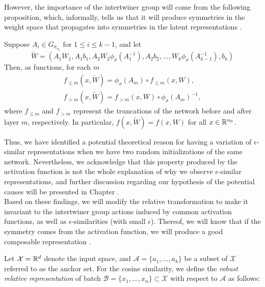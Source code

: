 \documentclass[../main.tex]{subfiles}
\begin{document}
However, the importance of the intertwiner group will come from the following proposition, which, informally, tells us that it will produce symmetries in the weight space that propagates into symmetries in the latent representations \cite{godfrey_symmetries_2023}.

\begin{proposition}
  \label{lem:comm-w-sig}
  Suppose $A_i \in G_{\sigma_{n_i}}$ for $1 \leq i \leq k-1$, and let 
  \begin{equation*}
  \widetilde{W}  = (A_1 W_1, A_1b_1, A_2 W_2 \phi_{\sigma}(A_1^{-1}), A_2 b_2 , \dots,
  W_{k}\phi_{\sigma}(A_{k-1}^{-1}), b_{k})
  \end{equation*}
  Then, as functions, for each $m$
  \begin{gather*}
       f_{\leq m}(x, \widetilde{W} ) = \phi_\sigma(A_m) \circ f_{\leq m}(x, W),\\
       f_{> m}(x, \widetilde{W} ) = f_{>m}(x, W) \circ \phi_{\sigma}(A_m)^{-1},
  \end{gather*}
  where $f_{\leq m}$ and $f_{> m}$ represent the truncations of the network before and after layer $m$, respectively. In particular, $f(x, \widetilde{W} ) = f(x, W)$ for all $x \in \mathbb{R}^{n_0}$.
\end{proposition}

Thus, we have identified a potential theoretical reason for having a variation of $\epsilon$-similar representations when we have two random initializations of the same network. Nevertheless, we acknowledge that this property produced by the activation function is not the whole explanation of why we observe $\epsilon$-similar representations, and further discussion regarding our hypothesis of the potential causes will be presented in Chapter .\\

Based on these findings, we will modify the relative transformation to make it invariant to the intertwiner group actions induced by common activation functions, as well as $\epsilon$-similarities (with small $\epsilon$). Thereof, we will know that if the symmetry comes from the activation function, we will produce a good composable representation \cite[Theorem 4.2]{godfrey_symmetries_2023}.

Let $\mathcal{X}=\mathbb{R}^d$ denote the input space, and $\mathcal{A}= \{a_1, ..., a_k\}$ be a subset of $\mathcal{X}$ referred to as the anchor set. For the cosine similarity, we define the \emph{robust relative representation} of batch $\mathcal{B} = \{x_1, ..., x_n\}\subset \mathcal{X}$ with respect to $\mathcal{A}$ as follows:
\end{document}
